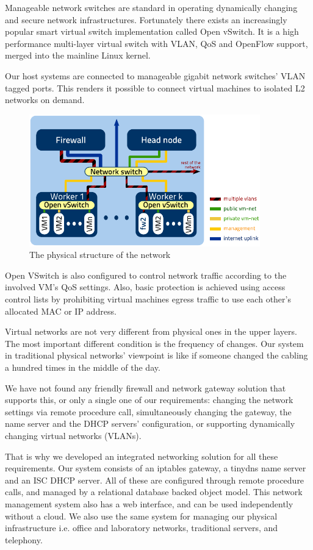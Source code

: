 \documentclass{llncs}
\begin{document}
   Manageable network switches are standard in operating dynamically changing and secure network infrastructures. Fortunately there exists an increasingly popular smart virtual switch implementation called Open vSwitch.\cite{pfaff2009extending} It is a high performance multi-layer virtual switch with VLAN, QoS and OpenFlow support, merged into the mainline Linux kernel.

   Our host systems are connected to manageable gigabit network switches' VLAN tagged ports. This renders it possible to connect virtual machines to isolated L2 networks on demand.

\begin{figure}[ht]
    \centering
    \includegraphics[width=10cm]{netarch}
    \caption{The physical structure of the network}
\end{figure}



   Open VSwitch is also configured to control network traffic according to the involved VM's QoS settings. Also, basic protection is achieved using access control lists by prohibiting virtual machines egress traffic to use each other's allocated MAC or IP address.

   Virtual networks are not very different from physical ones in the upper layers. The most important different condition is the frequency of changes. Our system in traditional physical networks' viewpoint is like if someone changed the cabling a hundred times in the middle of the day.

   We have not found any friendly firewall and network gateway solution that supports this, or only a single one of our requirements: changing the network settings via remote procedure call, simultaneously changing the gateway, the name server and the DHCP servers' configuration, or supporting dynamically changing virtual networks (VLANs).

   That is why we developed an integrated networking solution for all these requirements. Our system consists of an iptables gateway, a tinydns name server and an ISC DHCP server. All of these are configured through remote procedure calls, and managed by a relational database backed object model. This network management system also has a web interface, and can be used independently without a cloud. We also use the same system for managing our physical infrastructure i.e. office and laboratory networks, traditional servers, and telephony.
\end{document}
